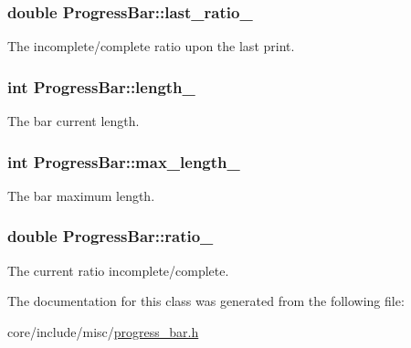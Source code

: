 \subsubsection[{last\+\_\+ratio\+\_\+}]{\setlength{\rightskip}{0pt plus 5cm}double Progress\+Bar\+::last\+\_\+ratio\+\_\+\hspace{0.3cm}{\ttfamily [private]}}\label{classProgressBar_a8a8f9d73ac47931be9e2c3840af0d084}
The incomplete/complete ratio upon the last print. \hypertarget{classProgressBar_ad35a128decfee0e0283388a2364af2b9}{}
\subsubsection[{length\+\_\+}]{\setlength{\rightskip}{0pt plus 5cm}int Progress\+Bar\+::length\+\_\+\hspace{0.3cm}{\ttfamily [private]}}\label{classProgressBar_ad35a128decfee0e0283388a2364af2b9}
The bar current length. \hypertarget{classProgressBar_a6d1fb65b7330c5c997aecf6db9b6b612}{}
\subsubsection[{max\+\_\+length\+\_\+}]{\setlength{\rightskip}{0pt plus 5cm}int Progress\+Bar\+::max\+\_\+length\+\_\+\hspace{0.3cm}{\ttfamily [private]}}\label{classProgressBar_a6d1fb65b7330c5c997aecf6db9b6b612}
The bar maximum length. \hypertarget{classProgressBar_a1559657830813de8c347cdbb13026faf}{}
\subsubsection[{ratio\+\_\+}]{\setlength{\rightskip}{0pt plus 5cm}double Progress\+Bar\+::ratio\+\_\+\hspace{0.3cm}{\ttfamily [private]}}\label{classProgressBar_a1559657830813de8c347cdbb13026faf}
The current ratio incomplete/complete. 

The documentation for this class was generated from the following file\+:\begin{DoxyCompactItemize}
\item 
core/include/misc/\hyperlink{progress__bar_8h}{progress\+\_\+bar.\+h}\end{DoxyCompactItemize}
